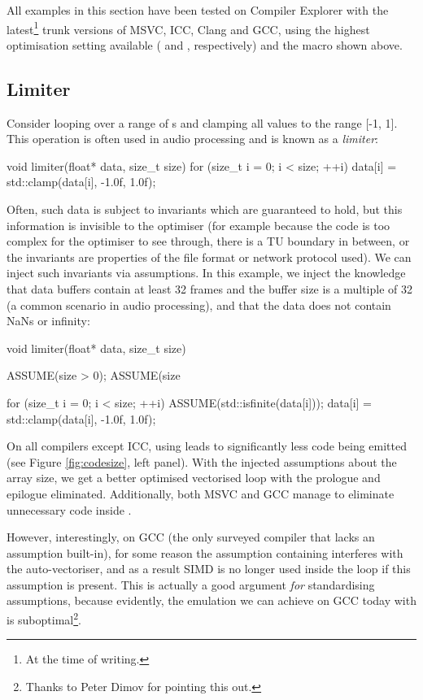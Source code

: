 All examples in this section have been tested on Compiler Explorer with the latest\footnote{At the time of writing.} trunk versions of MSVC, ICC, Clang and GCC, using the highest optimisation setting available ( and , respectively) and the  macro shown above.

\subsection{Limiter}

Consider looping over a range of s and clamping all values to the range [-1, 1]. This operation is often used in audio processing and is known as a \emph{limiter}:
\begin{codeblock}
void limiter(float* data, size_t size) {   
    for (size_t i = 0; i < size; ++i)
        data[i] = std::clamp(data[i], -1.0f, 1.0f);
}
\end{codeblock}
Often, such data is subject to invariants which are guaranteed to hold, but this information is invisible to the optimiser (for example because the code is too complex for the optimiser to see through, there is a TU boundary in between, or the invariants are properties of the file format or network protocol used). We can inject such invariants via assumptions. In this example, we inject the knowledge that data buffers contain at least 32 frames and the buffer size is a multiple of 32 (a common scenario in audio processing), and that the data does not contain NaNs or infinity:
\begin{codeblock}
void limiter(float* data, size_t size) {
    ASSUME(size > 0);
    ASSUME(size %
    
    for (size_t i = 0; i < size; ++i) {
        ASSUME(std::isfinite(data[i]));
        data[i] = std::clamp(data[i], -1.0f, 1.0f);
    }
}
\end{codeblock}

On all compilers except ICC, using  leads to significantly less code being emitted (see Figure \ref{fig:codesize}, left panel). With the injected assumptions about the array size, we get a better optimised vectorised loop with the prologue and epilogue eliminated. Additionally, both MSVC and GCC manage to eliminate unnecessary code inside .

However, interestingly, on GCC (the only surveyed compiler that lacks an assumption built-in), for some reason the assumption containing  interferes with the auto-vectoriser, and as a result SIMD is no longer used inside the loop if this assumption is present. This is actually a good argument \emph{for} standardising assumptions, because evidently, the emulation we can achieve on GCC today with  is suboptimal\footnote{Thanks to Peter Dimov for pointing this out.}.

